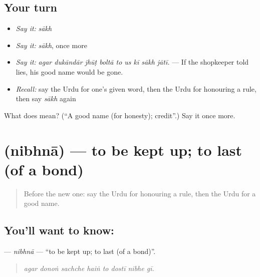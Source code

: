 \subsection*{Your turn}
\begin{itemize}
\raggedright
  \item \emph{Say it:} \emph{sākh}
  \item \emph{Say it:} \emph{sākh}, once more
  \item \emph{Say it:} \emph{agar dukāndār jhūṭ boltā to us kī sākh jātī.} — If the shopkeeper told lies, his good name would be gone.
  \item \emph{Recall:} say the Urdu for one's given word, then the Urdu for honouring a rule, then say \emph{sākh} again
\end{itemize}

\begin{tcolorbox}[breakable,colback=teal!4,colframe=teal!35!black,title={Before you move on}]
What does  mean? (\textquotedblleft{}A good name (for honesty); credit\textquotedblright{}.) Say it once more.
\end{tcolorbox}
\section[\texorpdfstring{\ur{نبھنا} (nibhnā)}{نبھنا (nibhnā)}]{ (nibhnā) — to be kept up; to last (of a bond)}

\label{lesson:UR-C531-nibhna}



\begin{quote}
Before the new one: say the Urdu for honouring a rule, then the Urdu for a good name.
\end{quote}

\subsection*{You'll want to know: }
\textbf{} — \emph{nibhnā} — \textquotedblleft{}to be kept up; to last (of a bond)\textquotedblright{}.

\begin{quote}
       
\end{quote}

\begin{quote}
\emph{agar donoṅ sachche haiṅ to dostī nibhe gī.}
\end{quote}


